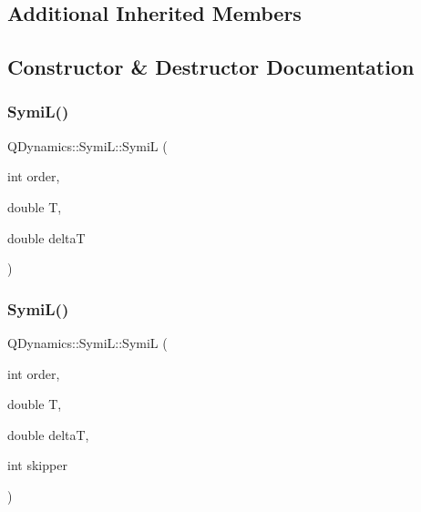 \subsection*{Additional Inherited Members}


\subsection{Constructor \& Destructor Documentation}
\mbox{\label{classQDynamics_1_1SymiL_ac220b2a8cccf6c3c8ca0d0f79c094fe7}} 
\subsubsection{\texorpdfstring{Symi\+L()}{SymiL()}\hspace{0.1cm}{\footnotesize\ttfamily [1/2]}}
{\footnotesize\ttfamily Q\+Dynamics\+::\+Symi\+L\+::\+SymiL (\begin{DoxyParamCaption}\item[{int}]{order,  }\item[{double}]{T,  }\item[{double}]{deltaT }\end{DoxyParamCaption})\hspace{0.3cm}{\ttfamily [inline]}}

\mbox{\label{classQDynamics_1_1SymiL_acdb13fb6bc527f687385dbdb05ff6e17}} 
\subsubsection{\texorpdfstring{Symi\+L()}{SymiL()}\hspace{0.1cm}{\footnotesize\ttfamily [2/2]}}
{\footnotesize\ttfamily Q\+Dynamics\+::\+Symi\+L\+::\+SymiL (\begin{DoxyParamCaption}\item[{int}]{order,  }\item[{double}]{T,  }\item[{double}]{deltaT,  }\item[{int}]{skipper }\end{DoxyParamCaption})\hspace{0.3cm}{\ttfamily [inline]}}



